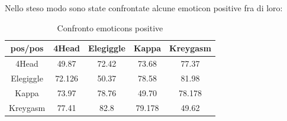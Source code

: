 \documentclass[a4paper,12pt,openright,twoside]{report}
\theoremstyle{definition}
\begin{document}
Nello steso modo sono state confrontate alcune emoticon positive fra di loro:
\begin{table}[H]
\begin{center}
\begin{tabular}{|c|c|c|c|c|}
\hline
pos/pos & 4Head & Elegiggle & Kappa & Kreygasm \\
\hline
\hline
4Head & 49.87 &  72.42 & 73.68 & 77.37 \\
\hline
Elegiggle & 72.126 & 50.37 & 78.58 & 81.98 \\
\hline
Kappa & 73.97 & 78.76 & 49.70 & 78.178 \\
\hline
Kreygasm & 77.41 & 82.8 & 79.178 & 49.62 \\
\hline
\end{tabular}
\end{center}
\caption{Confronto emoticons positive}
\label{tab:rnnlmTest2}
\end{table}
\end{document}
